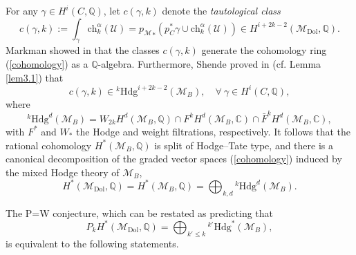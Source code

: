 \documentclass[11pt]{amsart}
\theoremstyle{plain}
\theoremstyle{definition}
\theoremstyle{remark}
\newcommand{\BC}{{\mathbb{C}}}
\newcommand{\BQ}{{\mathbb{Q}}}
\newcommand{\CM}{{\mathcal M}}
\newcommand{\CU}{{\mathcal U}}
\begin{document}
For any $\gamma \in H^i(C, \BQ)$, let $c(\gamma ,k)$ denote the \emph{tautological class}
\begin{equation}\label{taut_class}
c(\gamma ,k) := \int_\gamma \mathrm{ch}_k^\alpha(\CU) = {p_{\CM}}_\ast( p_C^\ast \gamma \cup \mathrm{ch}^\alpha_k(\CU)) \in H^{i+2k-2}(\CM_{\mathrm{Dol}}, \BQ).
\end{equation}
Markman showed in \cite{Markman} that the classes $c(\gamma,k)$ generate the cohomology ring (\ref{cohomology}) as a $\BQ$-algebra. Furthermore, Shende proved in \cite{Shende} { (cf. Lemma \ref{lem3.1})}  that 
\begin{equation}\label{taut_weight}
    c(\gamma,k) \in {^k\mathrm{Hdg}^{i+2k-2}(\CM_B)},\quad \forall~\gamma \in H^i(C, \BQ),
\end{equation}
where 
\[
^k\mathrm{Hdg}^d(\CM_B) =  W_{2k}H^d(\CM_B, \BQ) \cap F^k H^d(\CM_B, \BC) \cap \bar{F}^k H^d(\CM_B, \BC),
\]
with $F^*$ and $W_*$ the Hodge  and weight filtrations, respectively. It follows that  the rational cohomology  $H^*(\CM_B, \BQ)$ is split  of Hodge--Tate type, and there is a canonical decomposition of 
the graded vector spaces (\ref{cohomology}) induced by the mixed  Hodge theory of $\CM_B$,
\begin{equation}\label{weight_decomp}
H^\ast(\CM_{\mathrm{Dol}}, \BQ) = H^\ast(\CM_B, \BQ) = \bigoplus_{k,d}  {^k\mathrm{Hdg}^d(\CM_B)}.
\end{equation}


The P=W conjecture, 
which can be restated as predicting that
\begin{equation}\label{p=w-explicit}
P_k H^\ast(\CM_{\mathrm{Dol}}, \BQ) = \bigoplus_{k' \leq k}  {^{k'}\mathrm{Hdg}^*(\CM_B)},
\end{equation} 
 is equivalent to the following statements.

\end{document}
